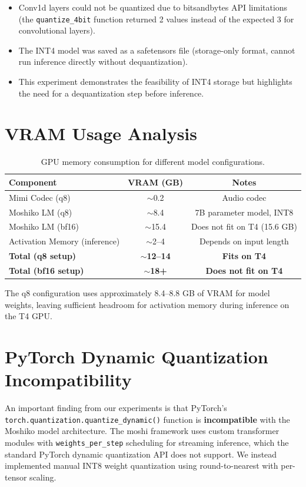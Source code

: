 \documentclass[12pt,a4paper]{report}
\begin{document}
\begin{itemize}
    \item Conv1d layers could not be quantized due to bitsandbytes API limitations (the \texttt{quantize\_4bit} function returned 2 values instead of the expected 3 for convolutional layers).
    \item The INT4 model was saved as a safetensors file (storage-only format, cannot run inference directly without dequantization).
    \item This experiment demonstrates the feasibility of INT4 storage but highlights the need for a dequantization step before inference.
\end{itemize}

\section{VRAM Usage Analysis}

\begin{table}[H]
\centering
\caption{GPU memory consumption for different model configurations.}
\label{tab:vram}
\begin{tabular}{@{}lcc@{}}
\toprule
\textbf{Component} & \textbf{VRAM (GB)} & \textbf{Notes} \\
\midrule
Mimi Codec (q8) & $\sim$0.2 & Audio codec \\
Moshiko LM (q8) & $\sim$8.4 & 7B parameter model, INT8 \\
Moshiko LM (bf16) & $\sim$15.4 & Does not fit on T4 (15.6 GB) \\
Activation Memory (inference) & $\sim$2--4 & Depends on input length \\
\midrule
\textbf{Total (q8 setup)} & \textbf{$\sim$12--14} & \textbf{Fits on T4} \\
\textbf{Total (bf16 setup)} & \textbf{$\sim$18+} & \textbf{Does not fit on T4} \\
\bottomrule
\end{tabular}
\end{table}

The q8 configuration uses approximately 8.4--8.8 GB of VRAM for model weights, leaving sufficient headroom for activation memory during inference on the T4 GPU.

\section{PyTorch Dynamic Quantization Incompatibility}

An important finding from our experiments is that PyTorch's \texttt{torch.quantization.quantize\_dynamic()} function is \textbf{incompatible} with the Moshiko model architecture. The moshi framework uses custom transformer modules with \texttt{weights\_per\_step} scheduling for streaming inference, which the standard PyTorch dynamic quantization API does not support. We instead implemented manual INT8 weight quantization using round-to-nearest with per-tensor scaling.
\end{document}
